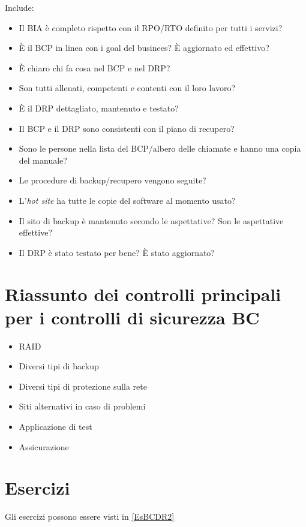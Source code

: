 Include:
\begin{itemize}
  \item Il BIA è completo rispetto con il RPO/RTO definito per tutti i servizi?
  \item È il BCP in linea con i goal del businees? È aggiornato ed effettivo?
  \item È chiaro chi fa cosa nel BCP e nel DRP?
  \item Son tutti allenati, competenti e contenti con il loro lavoro?
  \item È il DRP dettagliato, mantenuto e testato?
  \item Il BCP e il DRP sono consistenti con il piano di recupero?
  \item Sono le persone nella lista del BCP/albero delle chiamate e hanno una
    copia del manuale?
  \item Le procedure di backup/recupero vengono seguite?
  \item L'\textit{hot site} ha tutte le copie del software al momento usato?
  \item Il sito di backup è mantenuto secondo le aspettative? Son le aspettative
    effettive?
  \item Il DRP è stato testato per bene? È stato aggiornato?
\end{itemize}


\section{Riassunto dei controlli principali per i controlli di sicurezza BC}

\begin{itemize}
  \item RAID
  \item Diversi tipi di backup
  \item Diversi tipi di protezione sulla rete
  \item Siti alternativi in caso di problemi
  \item Applicazione di test
  \item Assicurazione
\end{itemize}

\section{Esercizi}

Gli esercizi possono essere visti in \ref{EsBCDR2}

